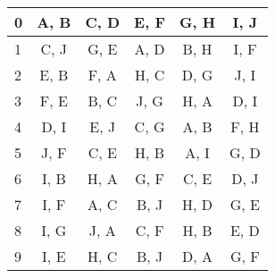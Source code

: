 \begin{table}[h]
\begin{minipage}{.5\textwidth}
{\begin{tabular}{l c c c c c}
			\midrule
			0 & A, B & C, D & E, F & G, H & I, J  \\ \midrule 
			1 & C, J & G, E & A, D & B, H & I, F  \\ \midrule 
			2 & E, B & F, A & H, C & D, G & J, I  \\ \midrule 
			3 & F, E & B, C & J, G & H, A & D, I  \\ \midrule
			4 & D, I & E, J & C, G & A, B & F, H  \\ \midrule 
			5 & J, F & C, E & H, B & A, I & G, D  \\ \midrule
			6 & I, B & H, A & G, F & C, E & D, J  \\ \midrule
			7 & I, F & A, C & B, J & H, D & G, E  \\ \midrule 
			8 & I, G & J, A & C, F & H, B & E, D  \\ \midrule
			9 & I, E & H, C & B, J & D, A & G, F  \\
			\bottomrule %
		\end{tabular}
		}
		\label{tab:task_splits_notmnist_new_dataset_experiment}
	\end{minipage} 
\end{table}

\begin{comment}

\begin{table}[h]
	\centering
	\small
	\caption{Task splits with their corresponding seed for test environments of Split MNIST datasets in the {\bf New Task Orders} experiments in Section \ref{paperD:sec:results_on_policy_generalization}. }
	\vspace{-2mm}
		\begin{tabular}{l c c c c c}
			\toprule %
			{\bf Seed} & {\bf Task 1} & {\bf Task 2} & {\bf Task 3} & {\bf Task 4} & {\bf Task 5} \\
			\midrule
			10 & 8, 2 & 5, 6 & 3, 1 & 0, 7 & 4, 9   \\ \midrule 
			11 & 7, 8 & 2, 6 & 4, 5 & 1, 3 & 0, 9  \\ \midrule 
			12 & 5, 8 & 7, 0 & 4, 9 & 3, 2 & 1, 6  \\ \midrule 
			13 & 3, 5 & 6, 1 & 4, 7 & 8, 9 & 0, 2  \\ \midrule
			14 & 3, 9 & 0, 5 & 4, 2 & 1, 7 & 6, 8  \\ \midrule 
			15 & 2, 6 & 1, 3 & 7, 0 & 9, 4 & 5, 8   \\ \midrule
			16 & 6, 2 & 0, 7 & 8, 4 & 3, 1 & 5, 9   \\ \midrule
			17 & 7, 2 & 5, 3 & 4, 0 & 9, 8 & 6, 1  \\ \midrule 
			18 & 7, 9 & 0, 4 & 2, 1 & 6, 5 & 8, 3  \\ \midrule
			19 & 1, 7 & 9, 6 & 8, 4 & 3, 0 & 2, 5   \\
			\bottomrule %
		\end{tabular}
	\label{tab:task_splits_mnist_new_task_orders_experiment}
\end{table}
	content...
\end{comment}



